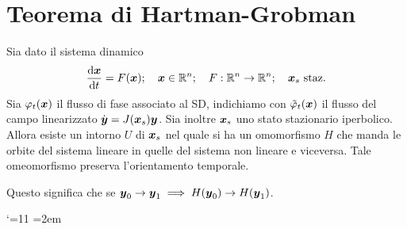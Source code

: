 \section{Teorema di Hartman-Grobman}%
\begin{thm}
Sia dato il sistema dinamico 
\[
    \frac{\text{d} \boldsymbol{x}}{\text{d} t} = F(\boldsymbol{x}); \quad \boldsymbol{x}\in \mathbb{R}^n; \quad F:\mathbb{R}^n\to \mathbb{R}^n; \quad \boldsymbol{x}_s \text{ staz}
.\] 
Sia $\varphi_t(\boldsymbol{x})$ il flusso di fase associato al SD, indichiamo con $\tilde{\varphi}_t(\boldsymbol{x})$ il flusso del campo linearizzato $\dot{\boldsymbol{y}}=J(\boldsymbol{x}_s) \boldsymbol{y}$. Sia inoltre $\boldsymbol{x}_s$ uno stato stazionario iperbolico.\\
Allora esiste un intorno $U$ di $\boldsymbol{x}_s$ nel quale si ha un omomorfismo $H$ che manda le orbite del sistema lineare in quelle del sistema non lineare e viceversa. 
Tale omeomorfismo preserva l'orientamento temporale.
\end{thm}
\noindent
Questo significa che se $\boldsymbol{y}_0\to \boldsymbol{y}_1 \implies  H(\boldsymbol{y}_0) \to H(\boldsymbol{y}_1)$.

\catcode`\@=11
\newdimen\cdsep
\cdsep=2em

\def\cdstrut{\vrule height .5\cdsep width 0pt depth .4\cdsep}
\def\@cdstrut{{\advance\cdsep by 2em\cdstrut}}

